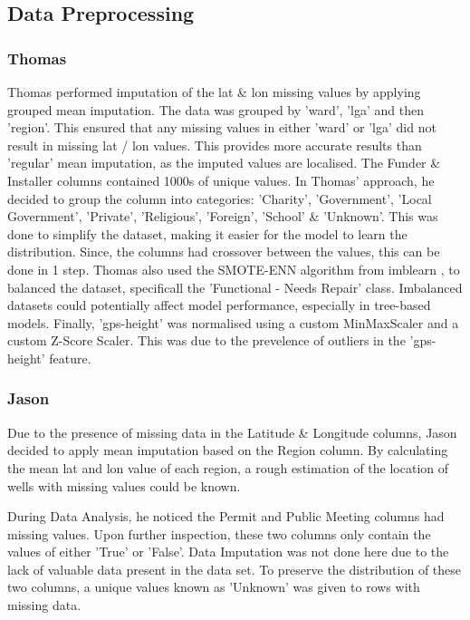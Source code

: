 \documentclass[conference]{IEEEtran}
\begin{document}
\subsection{Data Preprocessing}

\subsubsection{Thomas}

Thomas performed imputation of the lat \& lon missing values by applying grouped mean imputation. The data was grouped by 'ward', 'lga' and then 'region'. This ensured that any missing values in either 'ward' or 'lga' did not result in missing lat / lon values. This provides more accurate results than 'regular' mean imputation, as the imputed values are localised. The Funder \& Installer columns contained 1000s of unique values. In Thomas' approach, he decided to group the column into categories: 'Charity', 'Government', 'Local Government', 'Private', 'Religious', 'Foreign', 'School' \& 'Unknown'. This was done to simplify the dataset, making it easier for the model to learn the distribution. Since, the columns had crossover between the values, this can be done in 1 step. Thomas also used the SMOTE-ENN algorithm from imblearn \cite{smote-enn}, to balanced the dataset, specificall the 'Functional - Needs Repair' class. Imbalanced datasets could potentially affect model performance, especially in tree-based models. Finally, 'gps-height' was normalised using a custom MinMaxScaler and a custom Z-Score Scaler. This was due to the prevelence of outliers in the 'gps-height' feature.

\subsubsection{Jason}

Due to the presence of missing data in the Latitude \& Longitude columns, Jason decided to apply mean imputation based on the Region column. By calculating the mean lat and lon value of each region, a rough estimation of the  location of wells with missing values could be known. 

During Data Analysis, he noticed the Permit and Public Meeting columns had missing values. Upon further inspection, these two columns only contain the values of either 'True' or 'False'. Data Imputation was not done here due to the lack of valuable data present in the data set. To preserve the distribution of these two columns, a unique values known as 'Unknown' was given to rows with missing data.
\end{document}
